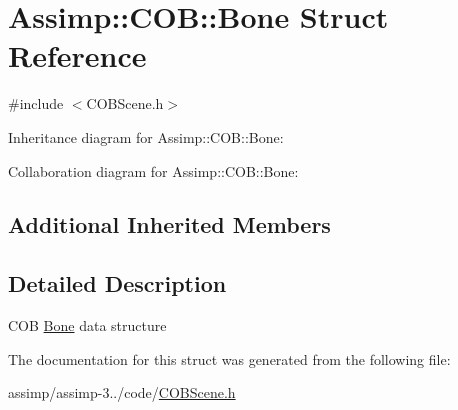 \hypertarget{struct_assimp_1_1_c_o_b_1_1_bone}{\section{Assimp\+:\+:C\+O\+B\+:\+:Bone Struct Reference}
\label{struct_assimp_1_1_c_o_b_1_1_bone}
}


{\ttfamily \#include $<$C\+O\+B\+Scene.\+h$>$}



Inheritance diagram for Assimp\+:\+:C\+O\+B\+:\+:Bone\+:


Collaboration diagram for Assimp\+:\+:C\+O\+B\+:\+:Bone\+:
\subsection*{Additional Inherited Members}


\subsection{Detailed Description}
C\+O\+B \hyperlink{struct_assimp_1_1_c_o_b_1_1_bone}{Bone} data structure 

The documentation for this struct was generated from the following file\+:\begin{DoxyCompactItemize}
\item 
assimp/assimp-\/3../code/\hyperlink{_c_o_b_scene_8h}{C\+O\+B\+Scene.\+h}\end{DoxyCompactItemize}
